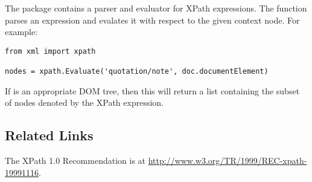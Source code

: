\documentclass{howto}
\begin{document}
The  package contains a parser and evaluator for
XPath expressions.  The  function parses an expression and evalates it with
respect to the given  context node.  For example:

\begin{verbatim}
from xml import xpath

nodes = xpath.Evaluate('quotation/note', doc.documentElement)
\end{verbatim}

If  is an appropriate DOM tree, then this will return a list
containing the subset of nodes denoted by the XPath expression.


\subsection{Related Links\label{section-xpath-links}}

The XPath 1.0 Recommendation is at
\url{http://www.w3.org/TR/1999/REC-xpath-19991116}.
\end{document}

